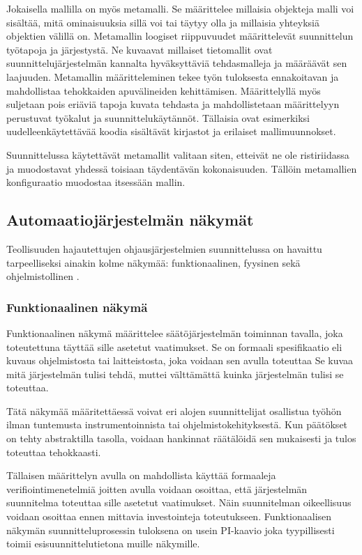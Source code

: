 \documentclass[finnish,12pt]{article}
\begin{document}
Jokaisella mallilla on myös metamalli. Se määrittelee millaisia objekteja malli voi sisältää, mitä ominaisuuksia sillä voi tai täytyy olla ja millaisia yhteyksiä objektien välillä on.
Metamallin loogiset riippuvuudet määrittelevät suunnittelun työtapoja ja järjestystä.
Ne kuvaavat millaiset tietomallit ovat suunnittelujärjestelmän kannalta hyväksyttäviä tehdasmalleja ja
määräävät sen laajuuden. Metamallin määritteleminen tekee työn tuloksesta ennakoitavan ja mahdollistaa tehokkaiden apuvälineiden kehittämisen.
Määrittelyllä myös suljetaan pois eriäviä tapoja kuvata tehdasta ja mahdollistetaan määrittelyyn perustuvat työkalut ja suunnittelukäytännöt.
Tällaisia ovat esimerkiksi uudelleenkäytettävää koodia sisältävät kirjastot ja erilaiset mallimuunnokset.

Suunnittelussa käytettävät metamallit valitaan siten, etteivät ne ole ristiriidassa ja muodostavat yhdessä toisiaan täydentävän kokonaisuuden.
Tällöin metamallien konfiguraatio muodostaa itsessään mallin.


	\subsection{Automaatiojärjestelmän näkymät}

Teollisuuden hajautettujen ohjausjärjestelmien suunnittelussa on havaittu
tarpeelliseksi ainakin kolme näkymää: funktionaalinen, fyysinen sekä ohjelmistollinen \cite{RefWorks:38}.


		\subsubsection{Funktionaalinen näkymä}

Funktionaalinen näkymä määrittelee säätöjärjestelmän toiminnan tavalla, joka toteutettuna täyttää sille asetetut vaatimukset.
Se on formaali spesifikaatio eli kuvaus ohjelmistosta tai laitteistosta, joka voidaan sen avulla toteuttaa
 Se kuvaa mitä järjestelmän tulisi tehdä, muttei välttämättä kuinka järjestelmän tulisi se toteuttaa.

Tätä näkymää määritettäessä voivat eri alojen suunnittelijat osallistua työhön ilman
tuntemusta instrumentoinnista tai ohjelmistokehityksestä. Kun päätökset on tehty
abstraktilla tasolla, voidaan hankinnat räätälöidä sen mukaisesti ja tulos
toteuttaa tehokkaasti.

Tällaisen määrittelyn avulla on mahdollista käyttää formaaleja verifiointimenetelmiä joitten avulla
voidaan osoittaa, että järjestelmän suunnitelma toteuttaa sille asetetut vaatimukset.
Näin suunnitelman oikeellisuus voidaan osoittaa ennen mittavia investointeja toteutukseen.
Funktionaalisen näkymän suunnitteluprosessin tuloksena on usein
PI-kaavio joka tyypillisesti toimii esisuunnittelutietona muille näkymille.
\end{document}
